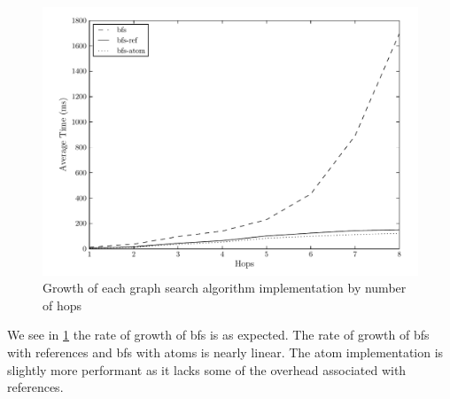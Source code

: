 				\begin{figure}
					\centering
					\includegraphics[scale=0.9]{figures/charts/growth.pdf}
					\caption{Growth of each graph search algorithm implementation by number of hops}
					\label{fig:growth}
				\end{figure}
				
				We see in \cref{fig:growth} the rate of growth of \gls{bfs} is as expected.  The rate of growth of \gls{bfs} with references and \gls{bfs} with atoms is nearly linear.  The atom implementation is slightly more performant as it lacks some of the overhead associated with references.
				
